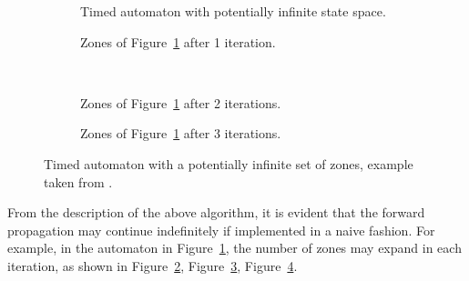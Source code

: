 \documentclass[a4paper]{llncs}
\begin{document}
\begin{figure}
  \centering
  \begin{subfigure}[b]{0.5\textwidth}
    \centering
    \def\svgwidth{\columnwidth}
    
    \caption{Timed automaton with potentially infinite state space.}
    \label{breaking2}
  \end{subfigure}%

  \begin{subfigure}[b]{0.3\textwidth}
    \centering
    \def\svgwidth{\columnwidth}
    
    \caption{Zones of Figure~\ref{breaking2} after 1 iteration.}
    \label{breaking2-zones01}
  \end{subfigure}
  ~ %
  \begin{subfigure}[b]{0.6\textwidth}
    \centering
    \def\svgwidth{\columnwidth}
    
    \caption{Zones of Figure~\ref{breaking2} after 2 iterations.}
    \label{breaking2-zones02}
  \end{subfigure}

  \begin{subfigure}[b]{\textwidth}
    \centering
    \def\svgwidth{0.9\columnwidth}
    
    \caption{Zones of Figure~\ref{breaking2} after 3 iterations.}
    \label{breaking2-zones03}
  \end{subfigure}
  \caption{Timed automaton with a potentially infinite
    set of zones, example taken from \cite{Behrmann03staticguard}.}
  \label{breaking2withzones}
\end{figure}

From the description of the above algorithm, it is evident that the
forward propagation may continue indefinitely if implemented in a
naive fashion. For example, in the automaton in
Figure~\ref{breaking2}, the number of zones may expand in each
iteration, as shown in Figure~\ref{breaking2-zones01},
Figure~\ref{breaking2-zones02}, Figure~\ref{breaking2-zones03}.



\end{document}
